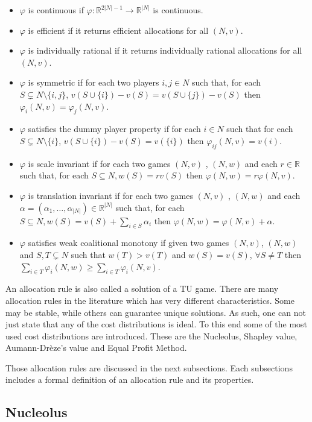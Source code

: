 \begin{itemize}
	\item $\varphi$ is continuous if $\varphi: \mathbb{R}^{2|N|-1} \rightarrow \mathbb{R}^{|N|}$ is continuous.
	\item $\varphi$ is efficient if it returns efficient allocations for all $(N,v)$.
	\item $\varphi$ is individually rational if it returns individually rational allocations for all $(N,v)$.
	\item $\varphi$ is symmetric if for each two players $i,j  \in N$ such that, for each $S \subsetneq N \setminus \{i,j\}$, $v(S \cup \{i\}) - v(S) = v(S \cup \{j\}) - v(S)$ then $\varphi_{i}(N,v) = \varphi_{j}(N,v)$.
	\item  $\varphi$ satisfies the dummy player property if for each $i \in N$ such that for each $S \subsetneq N \setminus \{ i\}$, $v(S\cup \{i\} ) - v(S) = v(\{i\})$ then $\varphi_{ij}(N,v) = v({i})$.
	\item $\varphi$ is scale invariant if for each two games $(N,v)$ , $(N,w)$ and each $r \in \mathbb{R}$ such that, for each $S \subseteq N, w(S)= rv(S)$ then $\varphi(N,w) = r\varphi(N,v)$.
	\item $\varphi$ is translation invariant if for each two games $(N,v)$ , $(N,w)$ and each $\alpha = (\alpha_{1}, \dots, \alpha_{|N|})\in \mathbb{R}^{|N|}$ such that, for each $S \subseteq N, w(S)= v(S) + \sum_{i \in S} \alpha_{i}$ then $\varphi(N,w) = \varphi(N,v) + \alpha$.	
	\item  $\varphi$ satisfies weak coalitional monotony if given two games $(
	N,v)$, $(N,w)$ and $S,T \subsetneq N $ such that $w(T) > v(T)$ and $w(S)= v(S)$, $\forall S \ne T$ then
	$\sum_{i \in T} \varphi_{i}(N,w) \geq \sum_{i \in T} \varphi_{i}(N,v)$.
\end{itemize}

An allocation rule is also called a solution of a TU game. There are many allocation rules in the literature which has very different characteristics. Some may be stable, while others can guarantee unique solutions. As such, one can not just state that any of the cost distributions is ideal. To this end some of the most used cost distributions are introduced. These are the Nucleolus, Shapley value, Aumann-Dr\`eze's value and Equal Profit Method.

Those allocation rules are discussed in the next subsections. Each subsections includes a formal definition of an allocation rule and its properties. 


\subsection{Nucleolus}\label{subNucleolus}

